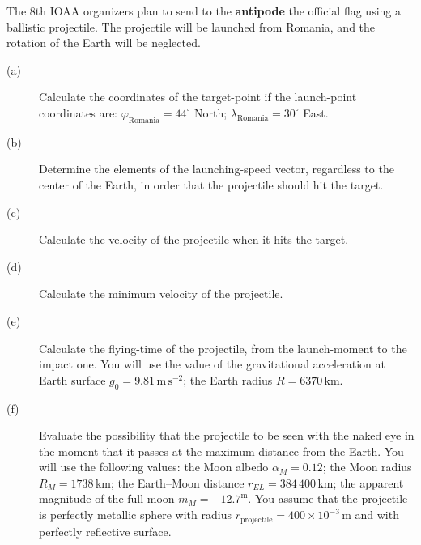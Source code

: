 The 8th IOAA organizers plan to send to the \textbf{antipode} the official
flag using a ballistic projectile. The projectile will be launched from
Romania, and the rotation of the Earth will be neglected.

\begin{description}
\item[(a)] Calculate the coordinates of the target-point if the launch-point
  coordinates are: $\varphi_{\mathrm{Romania}} = 44^\circ$ North;
  $\lambda_{\mathrm{Romania}} = 30^\circ$ East.
\item[(b)] Determine the elements of the launching-speed vector, regardless to
  the center of the Earth, in order that the projectile should hit the target.
\item[(c)] Calculate the velocity of the projectile when it hits the target.
\item[(d)] Calculate the minimum velocity of the projectile.
\item[(e)] Calculate the flying-time of the projectile, from the launch-moment
  to the impact one. You will use the value of the gravitational acceleration
  at Earth surface $g_0 = 9.81$\,$\mathrm{m\,s^{-2}}$; the Earth radius
  $R = 6370$\,km.
\item[(f)] Evaluate the possibility that the projectile to be seen with the
  naked eye in the moment that it passes at the maximum distance from the
  Earth. You will use the following values: the Moon albedo
  $\alpha_M = 0.12$; the Moon radius $R_M = 1738$\,km; the Earth--Moon
  distance $r_{EL} = 384\,400$\,km; the apparent magnitude of the full moon
  $m_M = -12.7^{\mathrm{m}}$. You assume that the projectile is perfectly
  metallic sphere with radius
  $r_{\mathrm{projectile}} = 400 \times 10^{-3}$\,m and with perfectly
  reflective surface.
\end{description}
